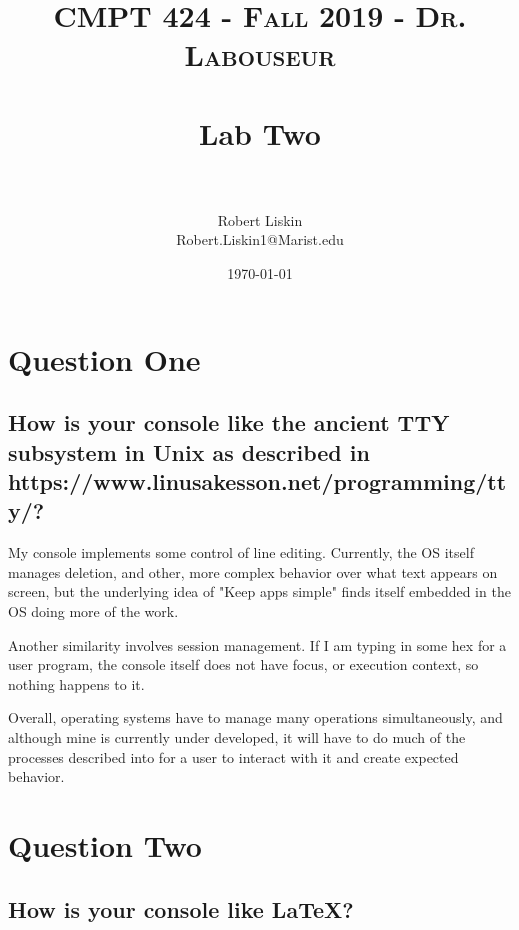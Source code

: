 \documentclass[letterpaper, 10pt,DIV=13]{scrartcl}
\title{	
   \normalfont \normalsize 
   \textsc{CMPT 424 - Fall 2019 - Dr. Labouseur} \\[10pt] %
   \horrule{0.5pt} \\[0.25cm] 	%
   \huge Lab Two  \\     	    %
   \horrule{0.5pt} \\[0.25cm] 	%
}
\author{Robert Liskin \\ \normalsize Robert.Liskin1@Marist.edu}
\date{\normalsize\today} 	%
\numberwithin{equation}{section} %
\numberwithin{figure}{section} %
\numberwithin{table}{section} %
\begin{document}
\maketitle %

\section{Question One}

\subsection{How is your console like the ancient TTY subsystem in Unix as described in
https://www.linusakesson.net/programming/tty/?}

My console implements some control of line editing. Currently, the OS itself manages deletion, and other, more complex behavior over what text appears on screen, but the underlying idea of "Keep apps simple" finds itself embedded in the OS doing more of the work.
\par
Another similarity involves session management. If I am typing in some hex for a user program, the console itself does not have focus, or execution context, so nothing happens to it.
\par
Overall, operating systems have to manage many operations simultaneously, and although mine is currently under developed, it will have to do much of the processes described into for a user to interact with it and create expected behavior.


\pagebreak
\section{Question Two}

\subsection{How is your console like LaTeX?}
\end{document}
